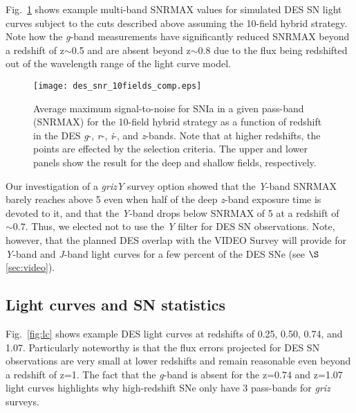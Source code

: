 \documentclass[preprint2]{aastex}    %
\begin{document}
Fig.~\ref{fig:des_snr_10fields} shows example multi-band SNRMAX values
for simulated DES SN light curves subject to the 
cuts described above assuming the 10-field hybrid strategy. 
Note how the \textit{g}-band measurements have 
significantly reduced SNRMAX beyond a redshift of z$\sim$0.5 and are absent beyond z$\sim$0.8 
due to the flux being redshifted out of the wavelength range of the light curve model.

\begin{figure}[ht]
\centerline{\texttt{[image: des\_snr\_10fields\_comp.eps]}}
\caption{Average maximum signal-to-noise for SNIa in a given pass-band (SNRMAX) for the 10-field hybrid strategy as a function of redshift in the DES \emph{g}-, \emph{r}-,  
\emph{i}-, and \emph{z}-bands. Note that at higher redshifts, the points are effected by the selection criteria. The upper and lower panels show the result for the deep and shallow fields, respectively.}
\label{fig:des_snr_10fields}
\end{figure}

Our investigation of a \textit{grizY} 
survey option showed that the \textit{Y}-band SNRMAX barely reaches above 5 
even when half of the deep \textit{z}-band exposure time is devoted to it, 
and that the \textit{Y}-band drops below SNRMAX of 5 at a redshift of $\sim0.7$. 
Thus, we elected not to use the \textit{Y} filter for DES SN observations. Note, 
however, that the planned DES overlap with the VIDEO Survey will provide for 
\textit{Y}-band and \textit{J}-band light curves for a few percent of the DES SNe (see $\S$\ref{sec:video}).


\subsection{Light curves and SN statistics}\label{sec:lc}

Fig.~\ref{fig:lc} shows example DES light curves at redshifts of 0.25, 0.50, 
0.74, and 1.07. Particularly noteworthy is that the flux errors projected for 
DES SN observations are very small at lower redshifts and remain reasonable 
even beyond a redshift of z=1. The fact that the \textit{g}-band is absent for 
the z=0.74 and z=1.07 light curves highlights why high-redshift SNe only 
have 3 pass-bands for \textit{griz} surveys. 
\end{document}
